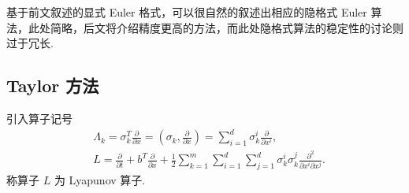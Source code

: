 基于前文叙述的显式 Euler 格式，可以很自然的叙述出相应的隐格式 Euler 算法，此处简略，后文将介绍精度更高的方法，而此处隐格式算法的稳定性的讨论则过于冗长.



\subsection{Taylor  方法}
引入算子记号
\[
\begin{aligned} 
& \Lambda_k = \sigma_k ^ T \frac{\partial }{\partial x}  =  (\sigma_k,\frac{\partial}{\partial x}) = \sum_{i=1}^d \sigma_k^i \frac{\partial}{\partial x^i},\\
& L = \frac{\partial}{\partial t} + b^T \frac{\partial}{\partial x} + \frac12 \sum_{k=1}^m \sum_{i=1}^d \sum_{j=1}^d \sigma_k^i \sigma_k^j \frac{\partial^2}{\partial x^i \partial x^j}.
\end{aligned}
\]
称算子 $L$ 为 Lyapunov 算子. 

